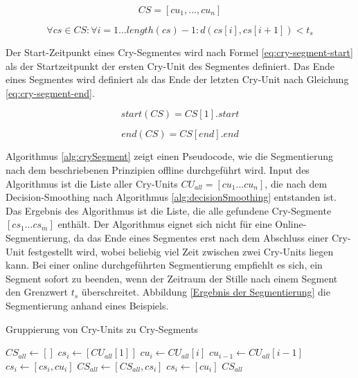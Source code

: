\begin{equation}
CS = [cu_1 ,  \ldots,  cu_n]
\label{eq:cry-segment}
\end{equation}

\begin{equation}
\forall cs \in CS: \forall i = 1 \ldots length(cs)-1 : d(cs[i], cs[i+1]) < t_{s}
\label{eq:cry-segment-nb}
\end{equation}

Der Start-Zeitpunkt eines Cry-Segmentes wird nach Formel \ref{eq:cry-segment-start} als der Startzeitpunkt der ersten Cry-Unit des Segmentes definiert. Das Ende eines Segmentes wird definiert als das Ende der letzten Cry-Unit nach Gleichung \ref{eq:cry-segment-end}.

\begin{equation}
start(CS) = CS[1].start
\label{eq:cry-segment-start}
\end{equation}

\begin{equation}
end(CS) = CS[end].end
\label{eq:cry-segment-end}
\end{equation}

Algorithmus \ref{alg:crySegment} zeigt einen Pseudocode, wie die Segmentierung nach dem beschriebenen Prinzipien offline durchgeführt wird. Input des Algorithmus ist die Liste aller Cry-Units $CU_{all} = [cu_1 ... cu_n]$, die nach dem Decision-Smoothing nach Algorithmus \ref{alg:decisionSmoothing} entstanden ist.  Das Ergebnis des Algorithmus ist die Liste, die alle gefundene Cry-Segmente  $[cs_1 ...  cs_m]$ enthält. Der Algorithmus eignet sich nicht für eine Online-Segmentierung, da das Ende eines Segmentes erst nach dem Abschluss einer Cry-Unit festgestellt wird, wobei beliebig viel Zeit zwischen zwei Cry-Units liegen kann. Bei einer online durchgeführten Segmentierung empfiehlt es sich, ein Segment sofort zu beenden, wenn der Zeitraum der Stille nach einem Segment den Grenzwert $t_s$ überschreitet. Abbildung \ref{Ergebnis der Segmentierung} die Segmentierung anhand eines Beispiels.

\begin{algorithm}[H]
	\caption{Gruppierung von Cry-Units zu Cry-Segments}
	\label{alg:crySegment}
	\begin{algorithmic}[1]
		\State $ CS_{all} \gets []$
		\State $ cs_i \gets [CU_{all}[1]]$
						\State $ cu_i \gets CU_{all}[i]$
						\State $cu_{i-1} \gets CU_{all}[i-1]$
								\State $cs_i \gets [cs_i , cu_i]$
						\Else
								\State $CS_{all} \gets [CS_{all}, cs_i]$
								\State $cs_i \gets [cu_i]$
						\EndIf
				\EndFor
		\Return $CS_{all}$
		
		\EndFunction
		
	\end{algorithmic}
\end{algorithm}

